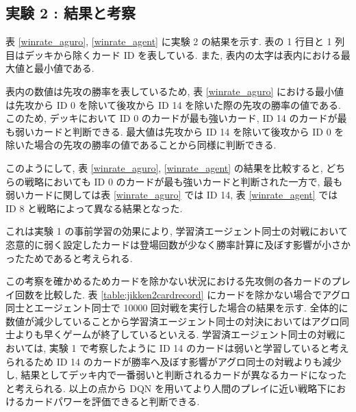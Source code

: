 \documentclass[12pt]{jarticle}
\begin{document}
\subsection{実験 2 : 結果と考察}
表 \ref{winrate_aguro}, \ref{winrate_agent} に実験 2 の結果を示す. 表の 1 行目と 1 列目はデッキから除くカード ID を表している. また, 表内の太字は表内における最大値と最小値である. 
\par
表内の数値は先攻の勝率を表しているため, 表 \ref{winrate_aguro} における最小値は先攻から ID 0 を除いて後攻から ID 14 を除いた際の先攻の勝率の値である. このため, デッキにおいて ID 0 のカードが最も強いカード, ID 14 のカードが最も弱いカードと判断できる. 最大値は先攻から ID 14 を除いて後攻から ID 0 を除いた場合の先攻の勝率の値であることから同様に判断できる.
\par
このようにして,  表 \ref{winrate_aguro}, \ref{winrate_agent} の結果を比較すると, どちらの戦略においても ID 0 のカードが最も強いカードと判断された一方で, 最も弱いカードに関しては表 \ref{winrate_aguro} では ID 14, 表 \ref{winrate_agent} では ID 8 と戦略によって異なる結果となった.\par
これは実験 1 の事前学習の効果により, 学習済エージェント同士の対戦において恣意的に弱く設定したカードは登場回数が少なく勝率計算に及ぼす影響が小さかったためであると考えられる. \par
この考察を確かめるためカードを除かない状況における先攻側の各カードのプレイ回数を比較した.
表 \ref{table:jikken2cardrecord} にカードを除かない場合でアグロ同士とエージェント同士で 10000 回対戦を実行した場合の結果を示す. 全体的に数値が減少していることから学習済エージェント同士の対決においてはアグロ同士よりも早くゲームが終了しているといえる.
学習済エージェント同士の対戦においては, 実験 1 で考察したように ID 14 のカードは弱いと学習していると考えられるため ID 14 のカードが勝率へ及ぼす影響がアグロ同士の対戦よりも減少し, 結果としてデッキ内で一番弱いと判断されるカードが異なるカードになったと考えられる.
以上の点から DQN を用いてより人間のプレイに近い戦略下におけるカードパワーを評価できると判断できる. 
\end{document}
